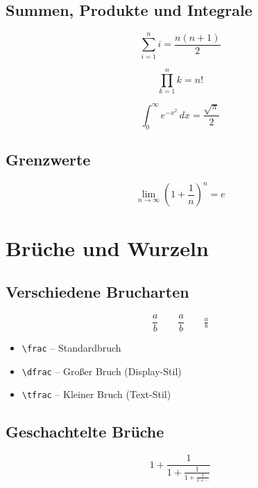 \section{Summen, Produkte und Integrale}

\[
    \sum_{i=1}^{n} i = \frac{n(n+1)}{2}
\]

\[
    \prod_{k=1}^{n} k = n!
\]

\[
    \int_{0}^{\infty} e^{-x^2}\, dx = \frac{\sqrt{\pi}}{2}
\]

\section{Grenzwerte}

\[
    \lim_{n \to \infty} \left(1 + \frac{1}{n}\right)^n = e
\]

\chapter{Brüche und Wurzeln}
\label{sec:brueche}

\section{Verschiedene Brucharten}

\begin{equation}
    \frac{a}{b} \qquad \dfrac{a}{b} \qquad \tfrac{a}{b}
    \label{eq:brucharten}
\end{equation}

\begin{itemize}
    \item \texttt{\textbackslash frac} -- Standardbruch
    \item \texttt{\textbackslash dfrac} -- Großer Bruch (Display-Stil)
    \item \texttt{\textbackslash tfrac} -- Kleiner Bruch (Text-Stil)
\end{itemize}

\section{Geschachtelte Brüche}

\begin{equation}
    1 + \frac{1}{1 + \frac{1}{1 + \frac{1}{1 + \cdots}}}
    \label{eq:kettenbruch}
\end{equation}

